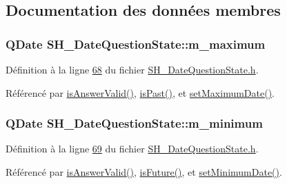 \subsection{Documentation des données membres}
\hypertarget{classSH__DateQuestionState_a9cb25c158f1622cf65b868c2bbab7e30}{
\subsubsection[{m\-\_\-maximum}]{\setlength{\rightskip}{0pt plus 5cm}Q\-Date S\-H\-\_\-\-Date\-Question\-State\-::m\-\_\-maximum\hspace{0.3cm}{\ttfamily [private]}}}\label{classSH__DateQuestionState_a9cb25c158f1622cf65b868c2bbab7e30}


Définition à la ligne \hyperlink{SH__DateQuestionState_8h_source_l00068}{68} du fichier \hyperlink{SH__DateQuestionState_8h_source}{S\-H\-\_\-\-Date\-Question\-State.\-h}.



Référencé par \hyperlink{classSH__DateQuestionState_a303e9f86c37ded79fb3ad4d31d183c21}{is\-Answer\-Valid()}, \hyperlink{classSH__DateQuestionState_ad16ab3d70e9356ca17c0a05d9a2093da}{is\-Past()}, et \hyperlink{classSH__DateQuestionState_a43fd05c32a82342a25ea860f25917253}{set\-Maximum\-Date()}.

\hypertarget{classSH__DateQuestionState_a9b4c46cf566ae037d816e1d6b66c777b}{
\subsubsection[{m\-\_\-minimum}]{\setlength{\rightskip}{0pt plus 5cm}Q\-Date S\-H\-\_\-\-Date\-Question\-State\-::m\-\_\-minimum\hspace{0.3cm}{\ttfamily [private]}}}\label{classSH__DateQuestionState_a9b4c46cf566ae037d816e1d6b66c777b}


Définition à la ligne \hyperlink{SH__DateQuestionState_8h_source_l00069}{69} du fichier \hyperlink{SH__DateQuestionState_8h_source}{S\-H\-\_\-\-Date\-Question\-State.\-h}.



Référencé par \hyperlink{classSH__DateQuestionState_a303e9f86c37ded79fb3ad4d31d183c21}{is\-Answer\-Valid()}, \hyperlink{classSH__DateQuestionState_a737a3f24e3bffbd367d439dd47fcc3cd}{is\-Future()}, et \hyperlink{classSH__DateQuestionState_a28dba9f895682e7722c1a245e0aac713}{set\-Minimum\-Date()}.



